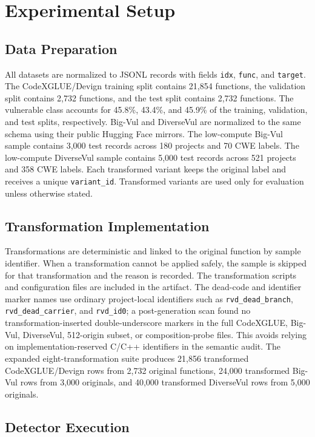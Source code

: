 \documentclass[a4paper,fleqn]{cas-dc}
\begin{document}
\section{Experimental Setup}

\subsection{Data Preparation}

All datasets are normalized to JSONL records with fields \texttt{idx},
\texttt{func}, and \texttt{target}. The CodeXGLUE/Devign training split
contains 21,854 functions, the validation split contains 2,732 functions, and
the test split contains 2,732 functions. The vulnerable class accounts for
45.8\%, 43.4\%, and 45.9\% of the training, validation, and test splits,
respectively. Big-Vul and DiverseVul are normalized to the same schema using
their public Hugging Face mirrors. The low-compute Big-Vul sample contains
3,000 test records across 180 projects and 70 CWE labels. The low-compute
DiverseVul sample contains 5,000 test records across 521 projects and 358 CWE
labels. Each transformed variant keeps the original label and receives a unique
\texttt{variant\_id}. Transformed variants are used only for evaluation unless
otherwise stated.

\subsection{Transformation Implementation}

Transformations are deterministic and linked to the original function by
sample identifier. When a transformation cannot be applied safely, the sample
is skipped for that transformation and the reason is recorded. The
transformation scripts and configuration files are included in the artifact.
The dead-code and identifier marker names use ordinary project-local
identifiers such as \texttt{rvd\_dead\_branch}, \texttt{rvd\_dead\_carrier},
and \texttt{rvd\_id0}; a post-generation scan found no transformation-inserted
double-underscore markers in the full CodeXGLUE, Big-Vul, DiverseVul,
512-origin subset, or composition-probe files. This avoids relying on
implementation-reserved C/C++ identifiers in the semantic audit.
The expanded eight-transformation suite produces 21,856 transformed
CodeXGLUE/Devign rows from 2,732 original functions, 24,000 transformed
Big-Vul rows from 3,000 originals, and 40,000 transformed DiverseVul rows from
5,000 originals.

\subsection{Detector Execution}
\end{document}
